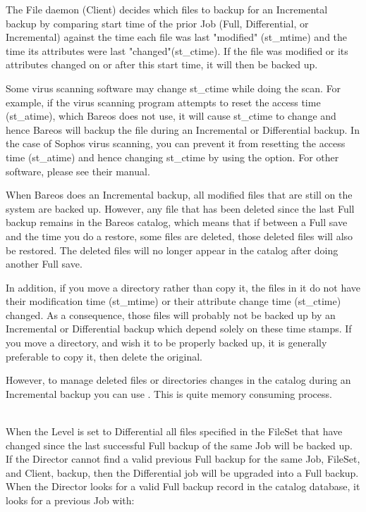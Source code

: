 {\begin{description}
\begin{description}
The File daemon (Client) decides which files to backup for an
Incremental backup by comparing start time of the prior Job (Full,
Differential, or Incremental) against the time each file was last
"modified" (st\_mtime) and the time its attributes were last
"changed"(st\_ctime).  If the file was modified or its attributes
changed on or after this start time, it will then be backed up.

Some virus scanning software may change st\_ctime while
doing the scan.  For example, if the virus scanning program attempts to
reset the access time (st\_atime), which Bareos does not use, it will
cause st\_ctime to change and hence Bareos will backup the file during
an Incremental or Differential backup.  In the case of Sophos virus
scanning, you can prevent it from resetting the access time (st\_atime)
and hence changing st\_ctime by using the 
option.  For other software, please see their manual.

When Bareos does an Incremental backup, all modified files that are
still on the system are backed up.  However, any file that has been
deleted since the last Full backup remains in the Bareos catalog,
which means that if between a Full save and the time you do a
restore, some files are deleted, those deleted files will also be
restored.  The deleted files will no longer appear in the catalog
after doing another Full save.

In addition, if you move a directory rather than copy it, the files in
it do not have their modification time (st\_mtime) or their attribute
change time (st\_ctime) changed.  As a consequence, those files will
probably not be backed up by an Incremental or Differential backup which
depend solely on these time stamps.  If you move a directory, and wish
it to be properly backed up, it is generally preferable to copy it, then
delete the original.

However, to manage deleted files or directories changes in the
catalog during an Incremental backup you can use .
This is quite memory consuming process.

\item [Differential] \hfill \\
When the Level is set to Differential
all files specified in the FileSet that have changed since the last
successful Full backup of the same Job will be backed up.
If the Director cannot find a
valid previous Full backup for the same Job, FileSet, and Client,
backup, then the Differential job will be upgraded into a Full backup.
When the Director looks for a valid Full backup record in the catalog
database, it looks for a previous Job with:


\end{description}
\end{description}}

